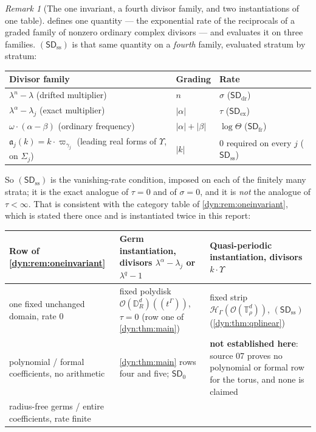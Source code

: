 \documentclass[11pt,letterpaper]{article}
\theoremstyle{definition}
\theoremstyle{remark}
\newtheorem{remark}[remark]{Remark}
\newcommand{\HH}{\mathscr H}
\newcommand{\OO}{\mathcal O}
\newcommand{\sdz}{\mathsf{SD}_{0}}
\newcommand{\sddr}{\mathsf{SD}_{\mathrm{dr}}}
\newcommand{\sdex}{\mathsf{SD}_{\mathrm{ex}}}
\newcommand{\sdfr}{\mathsf{SD}_{\mathrm{fr}}}
\newcommand{\sdss}{\mathsf{SD}_{\mathrm{ss}}}
\newcommand{\TT}{\mathbb T}
\newcommand{\strip}{\OO(\TT^{d}_{\rho})}
\newcommand{\fla}{\mathfrak a}
\numberwithin{equation}{section}
\begin{document}
\begin{remark}[The one invariant, a fourth divisor family, and two
instantiations of one table]\label{dyn:rem:qponeinvariant}
 defines one quantity --- the exponential rate
of the reciprocals of a graded family of nonzero ordinary complex divisors
--- and evaluates it on three families. $(\sdss)$ is that same quantity on
a \emph{fourth} family, evaluated stratum by stratum:
\begin{center}
\begin{tabular}{@{}lll@{}}
\toprule
Divisor family & Grading & Rate\\
\midrule
$\lambda^{n}-\lambda$ (drifted multiplier) & $n$ & $\sigma$ ($\sddr$)\\
$\lambda^{\alpha}-\lambda_j$ (exact multiplier) & $|\alpha|$ & $\tau$ ($\sdex$)\\
$\omega\cdot(\alpha-\beta)$ (ordinary frequency) & $|\alpha|+|\beta|$
 & $\log\Theta$ ($\sdfr$)\\
$\fla_j(k)=k\cdot\varpi_{\gamma_j}$ (leading real forms of $\Upsilon$,
 on $\Sigma_j$) & $|k|$ & $0$ required on every $j$ ($\sdss$)\\
\bottomrule
\end{tabular}
\end{center}
So $(\sdss)$ is the vanishing-rate condition, imposed on each of the
finitely many strata; it is the exact analogue of $\tau=0$ and of
$\sigma=0$, and it is \emph{not} the analogue of $\tau<\infty$. That is
consistent with the category table of \cref{dyn:rem:oneinvariant}, which is
stated there once and is instantiated twice in this report:
\begin{center}
\begin{tabular}{@{}P{0.30\textwidth}P{0.29\textwidth}P{0.31\textwidth}@{}}
\toprule
Row of \cref{dyn:rem:oneinvariant} & Germ instantiation, divisors
$\lambda^{\alpha}-\lambda_j$ or $\lambda^{q}-1$ & Quasi-periodic
instantiation, divisors $k\cdot\Upsilon$\\
\midrule
one fixed unchanged domain, rate $0$
& fixed polydisk $\OO(\mathbb D_R^{d})((t^{\Gamma}))$, $\tau=0$
 (row one of \cref{dyn:thm:main})
& fixed strip $\HH_\Gamma(\strip)$, $(\sdss)$
 (\cref{dyn:thm:qplinear})\\[3pt]
polynomial / formal coefficients, no arithmetic
& \cref{dyn:thm:main} rows four and five; $\sdz$
& \textbf{not established here}: source 07 proves no polynomial or formal
row for the torus, and none is claimed\\[3pt]
radius-free germs / entire coefficients, rate finite

\end{tabular}
\end{center}
\end{remark}
\end{document}
